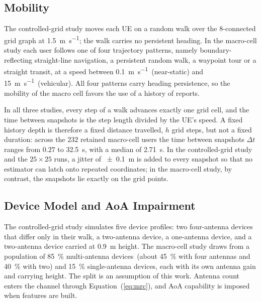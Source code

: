 \subsection{Mobility}
\label{subsec:mobility}

The controlled-grid study moves each UE on a random walk over the $8$-connected grid graph at \SI{1.5}{\meter\per\second}; the walk carries no persistent heading. In the macro-cell study each user follows one of four trajectory patterns, namely boundary-reflecting straight-line navigation, a persistent random walk, a waypoint tour or a straight transit, at a speed between \SI{0.1}{\meter\per\second}~(near-static) and \SI{15}{\meter\per\second}~(vehicular). All four patterns carry heading persistence, so the mobility of the macro cell favors the use of a history of reports.

In all three studies, every step of a walk advances exactly one grid cell, and the time between snapshots is the step length divided by the UE's speed. A fixed history depth is therefore a fixed distance travelled, $h$ grid steps, but not a fixed duration: across the $232$ retained macro-cell users the time between snapshots $\Delta t$ ranges from $0.27$ to \SI{32.5}{\second}, with a median of \SI{2.71}{\second}. In the controlled-grid study and the $25\times25$ runs, a jitter of \SI{+-0.1}{\meter} is added to every snapshot so that no estimator can latch onto repeated coordinates; in the macro-cell study, by contrast, the snapshots lie exactly on the grid points.

\subsection{Device Model and AoA Impairment}
\label{subsec:device-model}

The controlled-grid study simulates five device profiles: two four-antenna devices that differ only in their walk, a two-antenna device, a one-antenna device, and a two-antenna device carried at \SI{0.9}{\meter} height. The macro-cell study draws from a population of \SI{85}{\percent} multi-antenna devices~(about \SI{45}{\percent} with four antennas and \SI{40}{\percent} with two) and \SI{15}{\percent} single-antenna devices, each with its own antenna gain and carrying height. The split is an assumption of this work.
Antenna count enters the channel through Equation~(\ref{eq:mrc}), and AoA capability is imposed when features are built.

